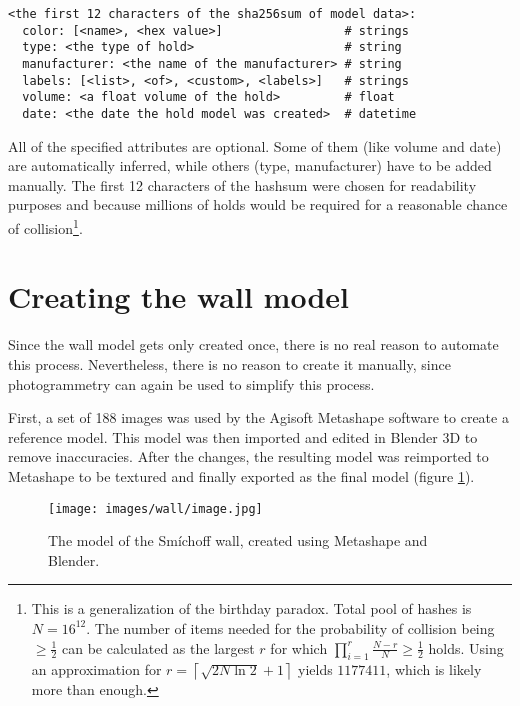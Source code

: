 \begin{verbatim}
<the first 12 characters of the sha256sum of model data>:
  color: [<name>, <hex value>]                 # strings
  type: <the type of hold>                     # string
  manufacturer: <the name of the manufacturer> # string
  labels: [<list>, <of>, <custom>, <labels>]   # strings
  volume: <a float volume of the hold>         # float
  date: <the date the hold model was created>  # datetime
\end{verbatim}

All of the specified attributes are optional.
Some of them (like volume and date) are automatically inferred, while others (type, manufacturer) have to be added manually.
The first 12 characters of the hashsum were chosen for readability purposes and because millions of holds would be required for a reasonable chance of collision\footnote{This is a generalization of the birthday paradox. Total pool of hashes is $N = 16^{12}$. The number of items needed for the probability of collision being $\ge \frac{1}{2}$ can be calculated as the largest $r$ for which $\prod_{i = 1}^{r} \frac{N - r}{N} \ge \frac{1}{2}$ holds. Using an approximation for $r = \left\lceil \sqrt{2N \ln 2} + 1 \right\rceil$ \cite{brink2012probably} yields $1177411$, which is likely more than enough.}.

\section{Creating the wall model}
Since the wall model gets only created once, there is no real reason to automate this process.
Nevertheless, there is no reason to create it manually, since photogrammetry can again be used to simplify this process.

First, a set of 188 images was used by the Agisoft Metashape software to create a reference model.
This model was then imported and edited in Blender 3D to remove inaccuracies.
After the changes, the resulting model was reimported to Metashape to be textured and finally exported as the final model (figure \ref{fig:model}).

\begin{figure}[h]
	\centering
	\texttt{[image: images/wall/image.jpg]}
	\caption{The model of the Smíchoff wall, created using Metashape and Blender.}
	\label{fig:model}
\end{figure}
